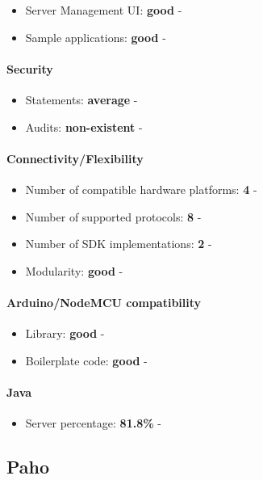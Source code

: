 \documentclass{article}
\begin{document}
\begin{itemize}
\item Server Management UI: \textbf{good} - 
\item Sample applications: \textbf{good} - 
\end{itemize}

\paragraph{Security} 

\begin{itemize}
\item Statements: \textbf{average} - 
\item Audits: \textbf{non-existent} - 
\end{itemize}

\paragraph{Connectivity/Flexibility}

\begin{itemize}
\item Number of compatible hardware platforms: \textbf{4} - 
\item Number of supported protocols: \textbf{8} - 
\item Number of SDK implementations: \textbf{2} - 
\item Modularity: \textbf{good} - 
\end{itemize}

\paragraph{Arduino/NodeMCU compatibility}

\begin{itemize}
\item Library: \textbf{good} - 
\item Boilerplate code: \textbf{good} - 
\end{itemize}

\paragraph{Java} 

\begin{itemize}
\item Server percentage: \textbf{81.8\%} - 
\end{itemize}

\subsection{Paho}
\end{document}
